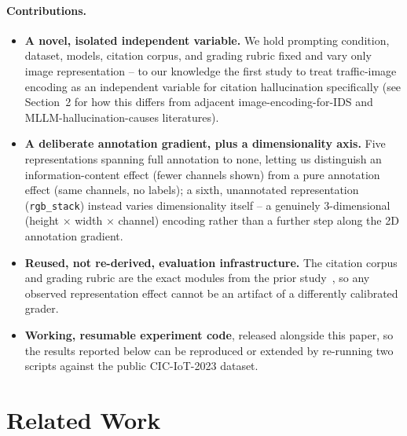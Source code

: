 \documentclass[twocolumn]{svjour3}
\begin{document}
\paragraph{Contributions.}
\begin{itemize}
\item \textbf{A novel, isolated independent variable.} We hold prompting condition, dataset,
models, citation corpus, and grading rubric fixed and vary only image representation -- to our
knowledge the first study to treat traffic-image encoding as an independent variable for citation
hallucination specifically (see Section~2 for how this differs from adjacent
image-encoding-for-IDS and MLLM-hallucination-causes literatures).
\item \textbf{A deliberate annotation gradient, plus a dimensionality axis.} Five representations
spanning full annotation to none, letting us distinguish an information-content effect (fewer
channels shown) from a pure annotation effect (same channels, no labels); a sixth, unannotated
representation (\texttt{rgb\_stack}) instead varies dimensionality itself -- a genuinely
3-dimensional (height $\times$ width $\times$ channel) encoding rather than a further step along the
2D annotation gradient.
\item \textbf{Reused, not re-derived, evaluation infrastructure.} The citation corpus and grading
rubric are the exact modules from the prior study~\cite{groundingcitation2026}, so any observed
representation effect cannot be an artifact of a differently calibrated grader.
\item \textbf{Working, resumable experiment code}, released alongside this paper, so the results
reported below can be reproduced or extended by re-running two scripts against the public
CIC-IoT-2023 dataset.
\end{itemize}

\section{Related Work}
\label{sec:related}
\end{document}
